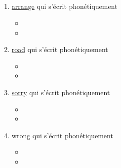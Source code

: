 \subsection{}\label{subsec:r}

\begin{enumerate}
\item \href{http://www.wordreference.com/enfr/arrange}{arrange} qui s'écrit phonétiquement \href{https://en.oxforddictionaries.com/definition/arrange}{}

  \begin{itemize}
  \item{}
  \item{}
  \end{itemize}


\item \href{http://www.wordreference.com/enfr/road}{road} qui s'écrit phonétiquement \href{https://en.oxforddictionaries.com/definition/road}{}

  \begin{itemize}
  \item{}
  \item{}
  \end{itemize}
  
\item \href{http://www.wordreference.com/enfr/sorry}{sorry} qui s'écrit phonétiquement \href{https://en.oxforddictionaries.com/definition/sorry}{}

  \begin{itemize}
  \item{}
  \item{}
  \end{itemize}

  
\item \href{http://www.wordreference.com/enfr/wrong}{wrong} qui s'écrit phonétiquement \href{https://en.oxforddictionaries.com/definition/wrong}{}

  \begin{itemize}
  \item{}
  \item{}
  \end{itemize}


\end{enumerate}

